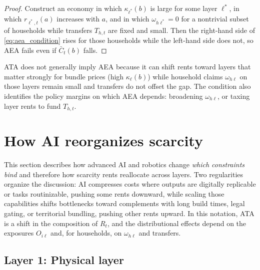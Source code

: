 \documentclass[11pt]{article}
\begin{document}
\begin{proof}
Construct an economy in which \(\kappa_{\ell^\ast}(b)\) is large for some layer \(\ell^\ast\), in which \(r_{\ell^\ast,t}(a)\) increases with \(a\), and in which \(\omega_{h\ell^\ast}=0\) for a nontrivial subset of households while transfers \(T_{h,t}\) are fixed and small. Then the right-hand side of \eqref{eq:aea_condition} rises for those households while the left-hand side does not, so AEA fails even if \(\bar{C}_t(b)\) falls.
\end{proof}

ATA does not generally imply AEA because it can shift rents toward layers that matter strongly for bundle prices (high \(\kappa_\ell(b)\)) while household claims \(\omega_{h\ell}\) on those layers remain small and transfers do not offset the gap. The condition also identifies the policy margins on which AEA depends: broadening \(\omega_{h\ell}\), or taxing layer rents to fund \(T_{h,t}\).

\section{How AI reorganizes scarcity}
\label{sec:layers}

This section describes how advanced AI and robotics change \emph{which constraints bind} and therefore how scarcity rents reallocate across layers. Two regularities organize the discussion: AI compresses costs where outputs are digitally replicable or tasks routinizable, pushing some rents downward, while scaling those capabilities shifts bottlenecks toward complements with long build times, legal gating, or territorial bundling, pushing other rents upward. In this notation, ATA is a shift in the composition of \(R_t\), and the distributional effects depend on the exposures \(O_{i\ell}\) and, for households, on \(\omega_{h\ell}\) and transfers.

\subsection{Layer 1: Physical layer}
\end{document}
